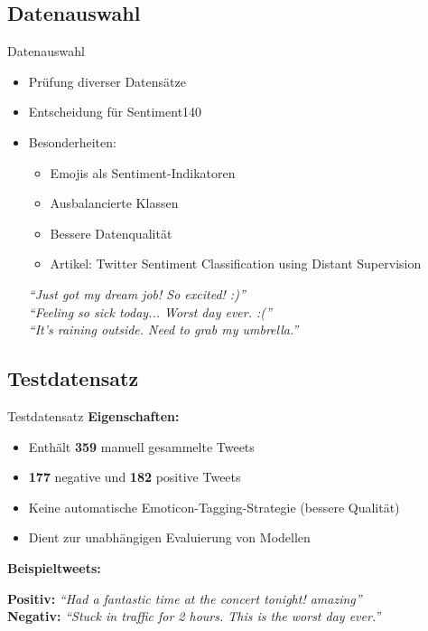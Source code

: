 \documentclass[aspectratio=169]{beamer} %
\begin{document}
\subsection{Datenauswahl}
\begin{frame}{Datenauswahl}
  \begin{itemize}
      \item Prüfung diverser Datensätze
      \item Entscheidung für \glqq Sentiment140\grqq
      \item Besonderheiten:
      \begin{itemize}
          \item Emojis als Sentiment-Indikatoren
          \item Ausbalancierte Klassen
          \item Bessere Datenqualität
          \item Artikel: \glqq Twitter Sentiment Classification using Distant Supervision\grqq
      \end{itemize}

      \vspace{0.5cm}
  \vspace{0.2cm}

   \textit{“Just got my dream job! So excited! :)”} \\
   \textit{“Feeling so sick today... Worst day ever. :(”} \\
   \textit{“It's raining outside. Need to grab my umbrella.”}

  \end{itemize}
\end{frame}

\subsection{Testdatensatz}
\begin{frame}{Testdatensatz}
  \textbf{Eigenschaften:}
  \begin{itemize}
      \item Enthält \textbf{359} manuell gesammelte Tweets
      \item \textbf{177} negative und \textbf{182} positive Tweets
      \item Keine automatische Emoticon-Tagging-Strategie (bessere Qualität)
      \item Dient zur unabhängigen Evaluierung von Modellen
  \end{itemize}

  \vspace{0.5cm}
  \textbf{Beispieltweets:}
  \vspace{0.2cm}

  \textbf{Positiv:} \textit{“Had a fantastic time at the concert tonight! amazing”} \\
  \textbf{Negativ:} \textit{“Stuck in traffic for 2 hours. This is the worst day ever.”}

\end{frame}
\end{document}
